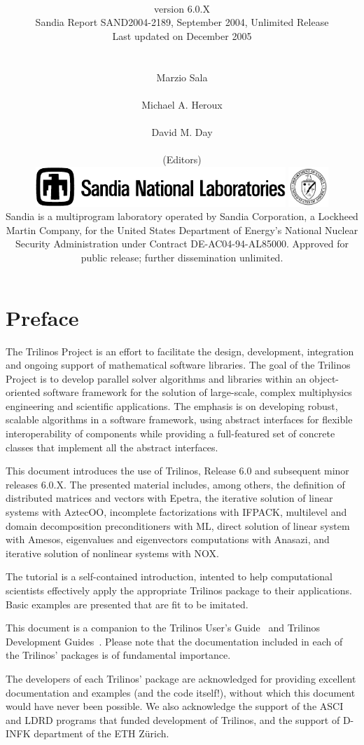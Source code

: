 \documentclass[final]{colabarticle}
\title{\textbf{\resizebox{10cm}{!}{Trilinos Tutorial}}\vspace{5mm}}
\subtitle{
  \\
  \vspace*{4mm}
  \Large version 6.0.X \\
  \vspace*{5mm}
  \noindent
  Sandia Report SAND2004-2189,
  September 2004,
  Unlimited Release \\
  \vspace*{5mm}
  \noindent
  Last updated on December 2005 \\
\vspace{6cm}\\
\\ \vspace{0mm}
\hspace*{1cm} Marzio Sala \\
\\ \vspace{0mm}
\hspace*{1cm} Michael A. Heroux\\
\\ \vspace{0mm}
\hspace*{1cm} David M. Day\\
\\ \vspace{0mm}
\hspace*{1cm} \normalsize (Editors) \\
\vspace*{1cm}
\vfill
\includegraphics[height=1.5cm]{snllineblk}  \hfill
\includegraphics[height=1.5cm]{DOEbwlogo}  \\
Sandia is a multiprogram laboratory operated by Sandia Corporation, 
a Lockheed Martin Company, for the United States Department of Energy's 
National Nuclear Security Administration under Contract DE-AC04-94-AL85000. 
Approved for public release; further dissemination unlimited. 
}
\newcommand{\Trilinos}{Trilinos}
\begin{document}
\maketitle

\chapter*{Preface}
  The Trilinos Project is an effort to facilitate the design,
  development, integration and ongoing support of mathematical software
  libraries.  The goal of the Trilinos Project is to develop parallel
  solver algorithms and libraries within an object-oriented software
  framework for the solution of large-scale, complex multiphysics
  engineering and scientific applications. The emphasis is on developing
  robust, scalable algorithms in a software framework, using abstract
  interfaces for flexible interoperability of components while providing
  a full-featured set of concrete classes that implement all the
  abstract interfaces.

  \medskip

  This document introduces the use of \Trilinos{}, Release 6.0 and 
  subsequent minor releases 6.0.X.  The
  presented material includes, among others, the definition of
  distributed matrices and vectors with Epetra, the iterative solution
  of linear systems with AztecOO, incomplete factorizations with IFPACK,
  multilevel and domain decomposition preconditioners with ML, direct
  solution of linear system with Amesos,
  eigenvalues and eigenvectors computations with Anasazi,
  and iterative solution of nonlinear systems with NOX.

  The tutorial is a self-contained introduction, intented to help
  computational scientists effectively apply the appropriate Trilinos
  package to their applications. Basic examples are presented that are
  fit to be imitated.

  \medskip

  This document is a companion to the Trilinos User's
  Guide~\cite{Trilinos-Users-Guide} and Trilinos Development
  Guides~\cite{Trilinos-Dev-Guide,Trilinos-Dev-Guide-II}. Please note
  that the documentation included in each of the Trilinos' packages is
  of fundamental importance.

  \bigskip

  The developers of each Trilinos' package are acknowledged for providing
  excellent documentation and examples (and the code itself!), 
  without which this document would have never been possible.  We also
  acknowledge the support of the ASCI and LDRD programs that funded
  development of Trilinos, and the support of D-INFK department of the ETH
  Z\"urich.
\end{document}
